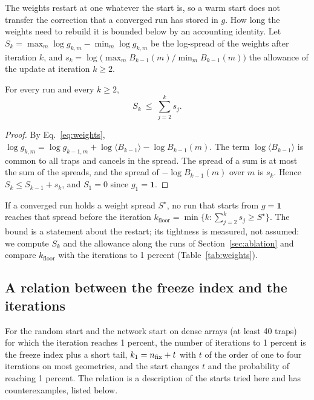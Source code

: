 The weights restart at one whatever the start is, so a warm start does not transfer the correction that a converged run has stored in $g$. How long the weights need to rebuild it is bounded below by an accounting identity. Let $S_k=\max_m\log g_{k,m}-\min_m\log g_{k,m}$ be the log-spread of the weights after iteration $k$, and
$s_k=\log\big(\max_mB_{k-1}(m)/\min_mB_{k-1}(m)\big)$ the allowance of the update at iteration $k\ge2$.

\begin{proposition}[allowance]\label{prop:allowance}
For every run and every $k\ge2$,
\begin{equation}
S_k\ \le\ \sum_{j=2}^{k}s_j .
\label{eq:allowance}
\end{equation}
\end{proposition}
\begin{proof}
By Eq.~\eqref{eq:weights}, $\log g_{k,m}=\log g_{k-1,m}+\log\langle B_{k-1}\rangle-\log B_{k-1}(m)$. The term $\log\langle B_{k-1}\rangle$ is common to all traps and cancels in the spread. The spread of a sum is at most the sum of the spreads, and the spread of $-\log B_{k-1}(m)$ over $m$ is $s_k$. Hence $S_k\le S_{k-1}+s_k$, and $S_1=0$ since $g_1=\mathbf 1$. \end{proof}

If a converged run holds a weight spread $S^\star$, no run that starts from $g=\mathbf 1$ reaches that spread before the iteration $k_{\mathrm{floor}}=\min\{k:\sum_{j=2}^ks_j\ge S^\star\}$. The bound is a statement about the restart; its tightness is measured, not assumed: we compute $S_k$ and the allowance along the runs of Section~\ref{sec:ablation} and compare $k_{\mathrm{floor}}$ with the iterations to 1 percent (Table~\ref{tab:weights}).

\subsection{A relation between the freeze index and the iterations}\label{sec:conjecture}

\begin{conjecture}\label{conj:freeze}
For the random start and the network start on dense arrays (at least 40 traps) for which the iteration reaches 1 percent, the number of iterations to 1 percent is the freeze index plus a short tail, $k_1=n_{\mathrm{fix}}+t$ with $t$ of the order of one to four iterations on most geometries, and the start changes $t$ and the probability of reaching 1 percent. The relation is a description of the starts tried here and has counterexamples, listed below.
\end{conjecture}

